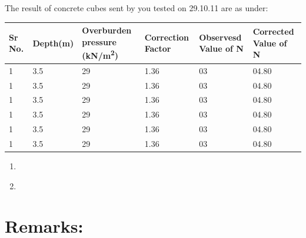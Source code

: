 \documentclass{soil12}
\begin{document}
\begin{center}
The result of concrete cubes sent by you tested on 29.10.11 are as under:
\end{center}
\hspace{1.1cm}
\begin{tabularx}{\textwidth}{|*{6}{l|}}
\hline
 \multicolumn{1}{|m{1cm}|}{Sr No.} &\multicolumn{1}{m{2cm}|}{Depth(m)} &\multicolumn{1}{m{2.5cm}|}{Overburden pressure (kN/m\textsuperscript{2})}
&\multicolumn{1}{m{2cm}|}{Correction Factor} &\multicolumn{1}{m{2cm}|}{Observesd Value of N} &\multicolumn{1}{m{2.9cm}|}{Corrected Value of N}\\
\hline
1 &3.5 &29 &1.36 &03 &04.80\\
\hline
1 &3.5 &29 &1.36 &03 &04.80\\
\hline
1 &3.5 &29 &1.36 &03 &04.80\\
\hline
1 &3.5 &29 &1.36 &03 &04.80\\
\hline
1 &3.5 &29 &1.36 &03 &04.80\\
\hline
1 &3.5 &29 &1.36 &03 &04.80\\
\hline
\end{tabularx}

\begin{enumerate}
\item{}
\item{
}
\end{enumerate}
\clearpage
\section{Remarks:}

\end{document}
